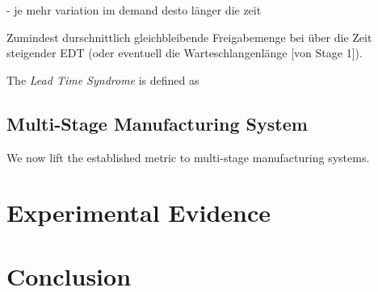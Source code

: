 \documentclass[mnsc]{informs3}
\begin{document}
- je mehr variation im demand desto länger die zeit


Zumindest durschnittlich gleichbleibende Freigabemenge bei über die Zeit steigender EDT (oder
eventuell die Warteschlangenlänge [von Stage 1]).


\begin{definition}
  The \emph{Lead Time Syndrome} is defined as
\end{definition}



\subsection{Multi-Stage Manufacturing System}
\label{subsec:Multi-Stage_Manufacturing_System}


We now lift the established metric to multi-stage manufacturing systems.


\section{Experimental Evidence}
\label{sec:Experimental_Evidence}


\section{Conclusion}
\label{sec:Conclusion}




\end{document}
